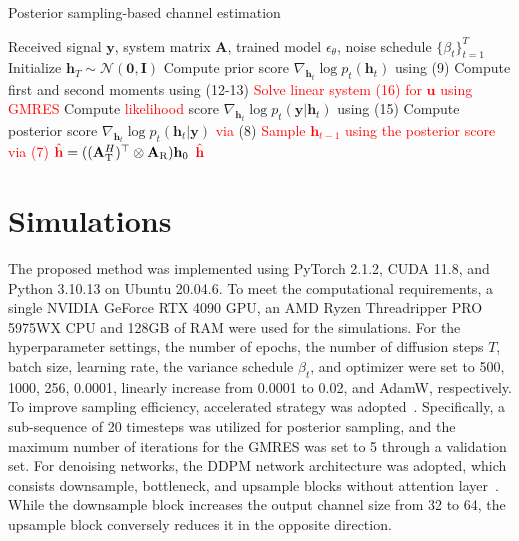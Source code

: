 \documentclass[lettersize,journal]{IEEEtran}
\newcommand{\tred}{\textcolor{red}}
\begin{document}
\begin{algorithm}[!t]
\caption{Posterior sampling-based channel estimation}
\label{alg:algorithm1}
\begin{algorithmic}[1]
\REQUIRE Received signal $\mathbf{y}$, system matrix $\mathbf{A}$, trained model $\epsilon_{\theta}$, noise schedule $\{\beta_{t}\}_{t=1}^{T}$
\STATE Initialize $\mathbf{h}_T \sim \mathcal{N}(\mathbf{0}, \mathbf{I})$
	\STATE Compute prior score $\nabla_{\mathbf{h}_{t}}\log p_{t}(\mathbf{h}_{t})$ using (9)
	\STATE Compute first and second moments using (12-13)
	\STATE \tred{Solve linear system (16) for $\mathbf{u}$ using GMRES}
	\STATE Compute \tred{likelihood} score $\nabla_{\mathbf{h}_{t}}\log p_{t}(\mathbf{y}|\mathbf{h}_{t})$ using (15)
	\STATE Compute posterior score $\nabla_{\mathbf{h}_{t}}\log p_{t}(\mathbf{h}_{t}|\mathbf{y})$ \tred{via} (8)
	\STATE \tred{Sample $\mathbf{h}_{t-1}$ using the posterior score via (7)}
\ENDFOR
\STATE $\tred{\hat{\mathbf{h}}} = ((\mathbf{A}_{\text{T}}^{H})^{\top}\otimes \mathbf{A}_{\text{R}})\mathbf{h}_{0}$
\RETURN $\tred{\hat{\mathbf{h}}}$
\end{algorithmic}
\end{algorithm}

\section{Simulations}

The proposed method was implemented using PyTorch 2.1.2, CUDA 11.8, and Python 3.10.13 on Ubuntu 20.04.6. To meet the computational requirements, a single NVIDIA GeForce RTX 4090 GPU, an AMD Ryzen Threadripper PRO 5975WX CPU and 128GB of RAM were used for the simulations. For the hyperparameter settings, the number of epochs, the number of diffusion steps $T$, batch size, learning rate, the variance schedule $\beta_{t}$, and optimizer were set to 500, 1000, 256, 0.0001, linearly increase from 0.0001 to 0.02, and AdamW, respectively.
To improve sampling efficiency, accelerated strategy was adopted~\cite{songDenoisingDiffusionImplicit2020}. Specifically, a sub-sequence of 20 timesteps was utilized for posterior sampling, and the maximum number of iterations for the GMRES was set to 5 through a validation set. For denoising networks, the DDPM network architecture was adopted, which consists downsample, bottleneck, and upsample blocks without attention layer~\cite{hoDenoisingDiffusionProbabilistic2020}. While the downsample block increases the output channel size from 32 to 64, the upsample block conversely reduces it in the opposite direction.
\end{document}
